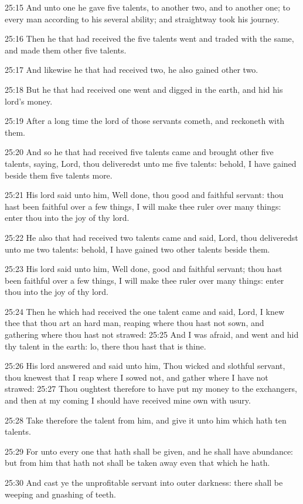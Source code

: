 25:15 And unto one he gave five talents, to another two, and to
another one; to every man according to his several ability; and
straightway took his journey.

25:16 Then he that had received the five talents went and traded with
the same, and made them other five talents.

25:17 And likewise he that had received two, he also gained other two.

25:18 But he that had received one went and digged in the earth, and
hid his lord's money.

25:19 After a long time the lord of those servants cometh, and
reckoneth with them.

25:20 And so he that had received five talents came and brought other
five talents, saying, Lord, thou deliveredst unto me five talents:
behold, I have gained beside them five talents more.

25:21 His lord said unto him, Well done, thou good and faithful
servant: thou hast been faithful over a few things, I will make thee
ruler over many things: enter thou into the joy of thy lord.

25:22 He also that had received two talents came and said, Lord, thou
deliveredst unto me two talents: behold, I have gained two other
talents beside them.

25:23 His lord said unto him, Well done, good and faithful servant;
thou hast been faithful over a few things, I will make thee ruler over
many things: enter thou into the joy of thy lord.

25:24 Then he which had received the one talent came and said, Lord, I
knew thee that thou art an hard man, reaping where thou hast not sown,
and gathering where thou hast not strawed: 25:25 And I was afraid, and
went and hid thy talent in the earth: lo, there thou hast that is
thine.

25:26 His lord answered and said unto him, Thou wicked and slothful
servant, thou knewest that I reap where I sowed not, and gather where
I have not strawed: 25:27 Thou oughtest therefore to have put my money
to the exchangers, and then at my coming I should have received mine
own with usury.

25:28 Take therefore the talent from him, and give it unto him which
hath ten talents.

25:29 For unto every one that hath shall be given, and he shall have
abundance: but from him that hath not shall be taken away even that
which he hath.

25:30 And cast ye the unprofitable servant into outer darkness: there
shall be weeping and gnashing of teeth.

